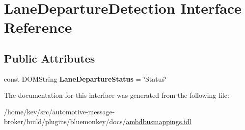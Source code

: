 \hypertarget{interfaceLaneDepartureDetection}{\section{Lane\+Departure\+Detection Interface Reference}
\label{interfaceLaneDepartureDetection}
}
\subsection*{Public Attributes}
\begin{DoxyCompactItemize}
\item 
\hypertarget{interfaceLaneDepartureDetection_a068d5ab2f6d467cffe3ba8a7abe12d44}{const D\+O\+M\+String {\bfseries Lane\+Departure\+Status} = \char`\"{}Status\char`\"{}}\label{interfaceLaneDepartureDetection_a068d5ab2f6d467cffe3ba8a7abe12d44}

\end{DoxyCompactItemize}


The documentation for this interface was generated from the following file\+:\begin{DoxyCompactItemize}
\item 
/home/kev/src/automotive-\/message-\/broker/build/plugins/bluemonkey/docs/\hyperlink{ambdbusmappings_8idl}{ambdbusmappings.\+idl}\end{DoxyCompactItemize}
